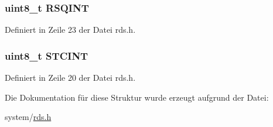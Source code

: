 \subsubsection[{R\+S\+Q\+I\+N\+T}]{\setlength{\rightskip}{0pt plus 5cm}uint8\+\_\+t R\+S\+Q\+I\+N\+T}\label{structstatus_a9637ec0bb6d40570ea68a1b96c5d561e}


Definiert in Zeile 23 der Datei rds.\+h.

\hypertarget{structstatus_a1026d3a63b328db2451abc49e0bd5a2c}{}
\subsubsection[{S\+T\+C\+I\+N\+T}]{\setlength{\rightskip}{0pt plus 5cm}uint8\+\_\+t S\+T\+C\+I\+N\+T}\label{structstatus_a1026d3a63b328db2451abc49e0bd5a2c}


Definiert in Zeile 20 der Datei rds.\+h.



Die Dokumentation für diese Struktur wurde erzeugt aufgrund der Datei\+:\begin{DoxyCompactItemize}
\item 
system/\hyperlink{rds_8h}{rds.\+h}\end{DoxyCompactItemize}
